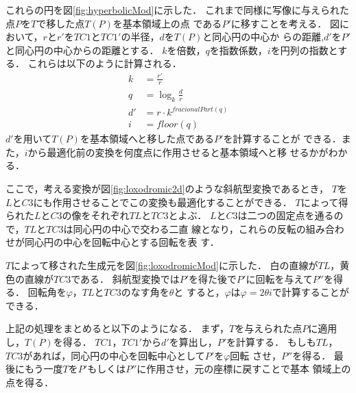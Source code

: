 これらの円を図\ref{fig:hyperbolicMod}に示した．
これまで同様に写像に与えられた点$P$を$T$で移した点$T(P)$を基本領域上の点
である$P'$に移すことを考える．
図において，$r$と$r'$を$TC1$と$TC1'$の半径，$d$を$T(P)$と同心円の中心か
らの距離,$d'$を$P'$と同心円の中心からの距離とする．
$k$を倍数，$q$を指数係数，$i$を円列の指数とする．
これらは以下のように計算される．
 \begin{align*}
  k &= \frac{r'}{r}\\
  q &= \log_{k} \frac{d}{r}\\
  d' &= r \cdot k^{fracionalPart(q)}\\
  i &= floor(q)
 \end{align*}
$d'$を用いて$T(P)$を基本領域へと移した点である$P'$を計算することが
できる．また，$i$から最適化前の変換を何度点に作用させると基本領域へと移
せるかがわかる．

ここで，考える変換が図\ref{fig:loxodromic2d}のような斜航型変換であるとき，
$T$を$L$と$C3$にも作用させることでこの変換も最適化することができる．
$T$によって得られた$L$と$C3$の像をそれぞれ$TL$と$TC3$とよぶ．
$L$と$C3$は二つの固定点を通るので，$TL$と$TC3$は同心円の中心で交わる二直
線となり，これらの反転の組み合わせが同心円の中心を回転中心とする回転を表
す．

$T$によって移された生成元を図\ref{fig:loxodromicMod}に示した．
白の直線が$TL$，黄色の直線が$TC3$である．
斜航型変換では$P'$を得た後で$P'$に回転を与えて$P''$を得る．
回転角を$\varphi$，$TL$と$TC3$のなす角を$\theta$と
すると，$\varphi$は$\varphi = 2 \theta i$で計算することができる．

上記の処理をまとめると以下のようになる．
まず，$T$を与えられた点$P$に適用し，$T(P)$を得る．
$TC1$，$TC1'$から$d'$を算出し，$P'$を計算する．
もしも$TL$，$TC3$があれば，同心円の中心を回転中心として$P'$を$\varphi$回転
させ，$P''$を得る．
最後にもう一度$T$を$P'$もしくは$P''$に作用させ，元の座標に戻すことで基本
領域上の点を得る．

